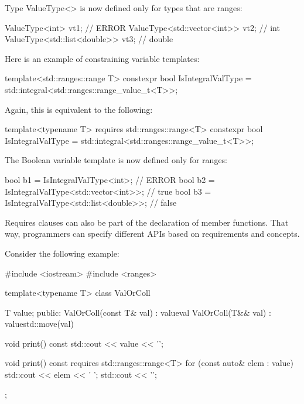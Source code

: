 Type ValueType<> is now defined only for types that are ranges:

\begin{cpp}
ValueType<int> vt1; // ERROR
ValueType<std::vector<int>> vt2; // int
ValueType<std::list<double>> vt3; // double
\end{cpp}


Here is an example of constraining variable templates:

\begin{cpp}
template<std::ranges::range T>
constexpr bool IsIntegralValType = std::integral<std::ranges::range_value_t<T>>;
\end{cpp}

Again, this is equivalent to the following:

\begin{cpp}
template<typename T>
requires std::ranges::range<T>
constexpr bool IsIntegralValType = std::integral<std::ranges::range_value_t<T>>;
\end{cpp}

The Boolean variable template is now defined only for ranges:

\begin{cpp}
bool b1 = IsIntegralValType<int>; // ERROR
bool b2 = IsIntegralValType<std::vector<int>>; // true
bool b3 = IsIntegralValType<std::list<double>>; // false
\end{cpp}


Requires clauses can also be part of the declaration of member functions. That way, programmers can specify different APIs based on requirements and concepts.

Consider the following example:


\begin{cpp}
#include <iostream>
#include <ranges>

template<typename T>
class ValOrColl {
	T value;
	public:
	ValOrColl(const T& val)
	: value{val} {
	}
	ValOrColl(T&& val)
	: value{std::move(val)} {
	}
	
	void print() const {
		std::cout << value << '\n';
	}
	
	void print() const requires std::ranges::range<T> {
		for (const auto& elem : value) {
			std::cout << elem << ' ';
		}
		std::cout << '\n';
	}
};
\end{cpp}

